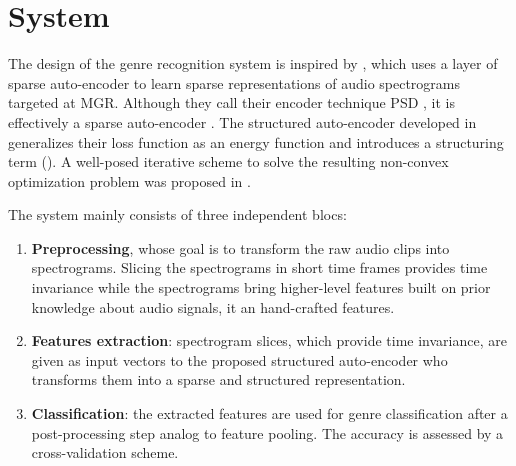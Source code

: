 




\chapter{System} \label{chap:system}

The design of the genre recognition system is inspired by \cite{lecun2011PSDaudio}, which uses a layer of sparse auto-encoder to learn sparse representations of audio spectrograms targeted at \gls{MGR}. Although they call their encoder technique \gls{PSD} \cite{lecun2010PSD}, it is effectively a sparse auto-encoder \cite{bengio2009learningDeepAI}. The structured auto-encoder developed in  generalizes their loss function as an energy function and introduces a structuring term (). A well-posed iterative scheme to solve the resulting non-convex optimization problem was proposed in .

The system mainly consists of three independent blocs:
\begin{enumerate}
	\item \textbf{Preprocessing}, whose goal is to transform the raw audio clips into spectrograms. Slicing the spectrograms in short time frames provides time invariance while the spectrograms bring higher-level features built on prior knowledge about audio signals, it  an hand-crafted features.
	\item \textbf{Features extraction}: spectrogram slices, which provide time invariance, are given as input vectors to the proposed structured auto-encoder who transforms them into a sparse and structured representation.
	\item \textbf{Classification}: the extracted features are used for genre classification after a post-processing step analog to feature pooling. The accuracy is assessed by a cross-validation scheme.
\end{enumerate}

